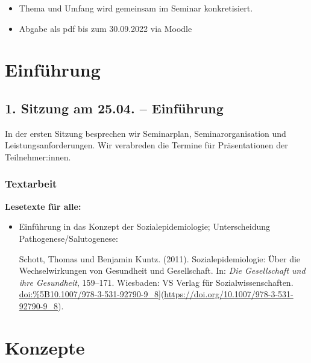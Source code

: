 \documentclass[
  ngerman,
]{article}
\providecommand{\tightlist}{%
  \setlength{\itemsep}{0pt}\setlength{\parskip}{0pt}}
\begin{document}
\begin{itemize}
\tightlist
\item
  Thema und Umfang wird gemeinsam im Seminar konkretisiert.
\item
  Abgabe als pdf bis zum 30.09.2022 via Moodle
\end{itemize}

\pagebreak

\hypertarget{einfuxfchrung}{%
\section*{Einführung}\label{einfuxfchrung}}

\hypertarget{sitzung-am-25.04.-einfuxfchrung}{%
\subsection*{1. Sitzung am 25.04. -- Einführung}\label{sitzung-am-25.04.-einfuxfchrung}}

In der ersten Sitzung besprechen wir Seminarplan, Seminarorganisation und Leistungsanforderungen. Wir verabreden die Termine für Präsentationen der Teilnehmer:innen.

\hypertarget{textarbeit}{%
\subsubsection*{Textarbeit}\label{textarbeit}}

\textbf{Lesetexte für alle:}

\begin{itemize}
\item
  Einführung in das Konzept der Sozialepidemiologie; Unterscheidung Pathogenese/Salutogenese:

  Schott, Thomas und Benjamin Kuntz. (2011). Sozialepidemiologie: Über die Wechselwirkungen von Gesundheit und Gesellschaft. In: \emph{Die Gesellschaft und ihre Gesundheit}, 159--171. Wiesbaden: VS Verlag für Sozialwissenschaften. \url{doi:\%5B10.1007/978-3-531-92790-9_8}{]}(\url{https://doi.org/10.1007/978-3-531-92790-9_8}).
\end{itemize}

\hypertarget{konzepte}{%
\section*{Konzepte}\label{konzepte}}
\end{document}
